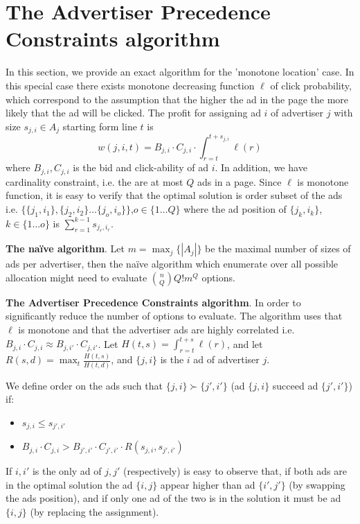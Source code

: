 
\section{The Advertiser Precedence Constraints algorithm}

In this section, we provide an exact algorithm for the 'monotone location' case.
In this special case there exists monotone decreasing function $\ell$ of click probability, which correspond to the assumption that the higher the ad in the page the more likely that the ad will be clicked.
The profit for assigning  ad $i$ of advertiser $j$ with size $s_{j,i} \in A_j$ starting form line $t$ is
$$w(j,i,t) = B_{j,i}\cdot C_{j,i} \cdot \int_{r=t}^{t+s_{j,i}} \ell(r)$$
where $B_{j,i}, C_{j,i}$ is the bid and click-ability of ad $i$. 
In addition, we have cardinality constraint, i.e. the are at most $Q$ ads in a page.  
Since $\ell$ is monotone function, it is easy to verify that the optimal solution is order subset of the ads i.e. $\{ \{j_1,i_1\},\{j_2,i_2\}\dots \{j_o,i_o\} \}$,$o\in \{1\dots Q\}$ where the ad position of $\{j_k,i_k\}$, $k\in \{1\dots o\}$ is $\sum_{r=1}^{k-1} s_{j_r,i_r}$. 

\textbf{The na{\"i}ve algorithm}.
Let $m = \max_j \{ |A_j| \}$ be the maximal number of sizes of ads per advertiser, then the na{\"i}ve algorithm which enumerate over all possible allocation might need to evaluate ${n \choose Q} Q! m^Q$ options.

\textbf{The Advertiser Precedence Constraints algorithm}. In order to significantly reduce the number of options to evaluate. The algorithm uses that $\ell$ is monotone and that the advertiser ads are highly correlated i.e. $B_{j,i} \cdot C_{j,i} \approx B_{j,{i'}} \cdot C_{j,i'}$.
 Let $H(t,s) = \int_{r=t}^{t+s} \ell(r)$, and let $R(s,d) = \max_t \frac{H(t,s)}{H(t,d)}$, and $\{j,i\}$ is the $i$ ad of advertiser $j$.   

We define order on the ads such that  $\{j,i\} \succ \{j',i'\}$ (ad $\{j,i\}$ succeed ad $\{j',i'\}$) if:
\begin{itemize}
	\item $s_{j,i} \leq s_{j',i'}$
	\item $B_{j,i}\cdot C_{j,i} > B_{j',i'}\cdot C_{j',i'} \cdot R(s_{j,i}, s_{j',i'})$
\end{itemize}

If $i,i'$ is the only ad of $j,j'$ (respectively) is easy to observe that, if both ads are in the optimal solution the ad $\{i,j\}$ appear higher than ad $\{i',j'\}$ (by swapping the ads position), and if only one ad of the two is in the solution it must be ad $\{i,j\}$ (by replacing the assignment).

